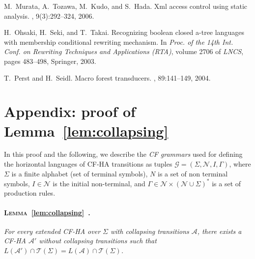 \documentclass[a4paper]{article}
\theoremstyle{plain}
\newcommand{\T}{\mathcal{T}}
\newcommand{\N}{\mathcal{N}}
\newcommand{\F}{\Sigma}
\newcommand{\A}{\mathcal{A}}
\newcommand{\G}{\mathcal{G}}
\begin{document}
\begin{thebibliography}{10}
M.~Murata, A.~Tozawa, M.~Kudo, and S.~Hada.
\newblock Xml access control using static analysis.
, 9(3):292--324, 2006.

H.~Ohsaki, H.~Seki, and T.~Takai.
\newblock Recognizing boolean closed a-tree languages with membership
  conditional rewriting mechanism.
\newblock In {\em Proc. of the 14th Int. Conf. on Rewriting Techniques and
  Applications (RTA)}, volume 2706 of {\em LNCS}, pages 483--498, Springer, 2003.

T.~Perst and H.~Seidl.
\newblock Macro forest transducers.
, 89:141--149, 2004.

\end{thebibliography}




\newpage
\appendix
\renewcommand{\thesection}{\Alph{section}}


\section{Appendix: proof of Lemma~\ref{lem:collapsing}}

In this proof and the following, 
we describe the \emph{CF grammars} 
used for defining the horizontal languages of CF-HA transitions
as tuples
$\G = (\Sigma, \N, I, \Gamma)$,  
where $\Sigma$ is a finite alphabet (set of terminal symbols), 
$N$ is a set of non terminal symbols, 
$I \in \N$ is the initial non-terminal, 
and $\Gamma \in \N \times (\N \cup \Sigma)^*$ is a set of production rules.


\paragraph{\textsc{Lemma}~\ref{lem:collapsing}~\cite{JR-rta2008}.}
{\it For every extended CF-HA over $\F$ with collapsing transitions $\A$, 
there exists a CF-HA $\A'$ without collapsing transitions such that 
$L(\A') \cap \T(\F) = L(\A) \cap \T(\F)$.}
\end{document}
